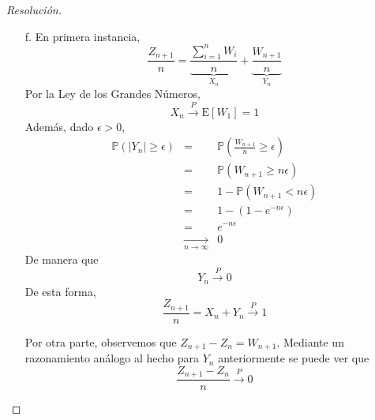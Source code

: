 \documentclass[a4paper,11pt]{article}
\newcommand{\abs}[1]{\ensuremath{\left\lvert #1 \right\rvert}}
\newcommand{\Exp}[1]{\ensuremath{\textrm{E}\left[#1\right]}}
\newcommand{\Prob}[1]{\ensuremath{\mathbb{P} \left( #1 \right)}}
\begin{document}
\begin{proof}[Resoluci\'on]
\begin{enumerate}
    \item[f.] En primera instancia,
    $$\frac{Z_{n+1}}{n} = \underbrace{\frac{\sum_{i=1}^{n}{W_i}}{n}}_{X_n} + \underbrace{\frac{W_{n+1}}{n}}_{Y_n}$$
    Por la Ley de los Grandes Números,
    $$X_n \overset{P}{\longrightarrow} \Exp{W_1} = 1$$
    Además, dado $\epsilon > 0$,
    \begin{eqnarray*}
        \Prob{\abs{Y_n} \geq \epsilon} &=& \Prob{\frac{W_{n+1}}{n} \geq \epsilon} \\
            &=& \Prob{W_{n+1} \geq n \epsilon} \\
            &=& 1 - \Prob{W_{n+1} < n \epsilon} \\
            &=& 1 - \left(1 - e^{-n \epsilon}\right) \\
            &=& e^{-n \epsilon} \\
            &\underset{n \to \infty}{\longrightarrow}& 0
    \end{eqnarray*}
    De manera que
    $$Y_n \overset{P}{\longrightarrow} 0$$
    De esta forma,
    $$\frac{Z_{n+1}}{n} = X_n + Y_n \overset{P}{\longrightarrow} 1$$

    Por otra parte, observemos que $Z_{n+1} - Z_n = W_{n+1}$. Mediante un razonamiento análogo
    al hecho para $Y_n$ anteriormente se puede ver que 
    $$\frac{Z_{n+1} - Z_n}{n} \overset{P}{\longrightarrow} 0$$
\end{enumerate}
\end{proof}
\end{document}
